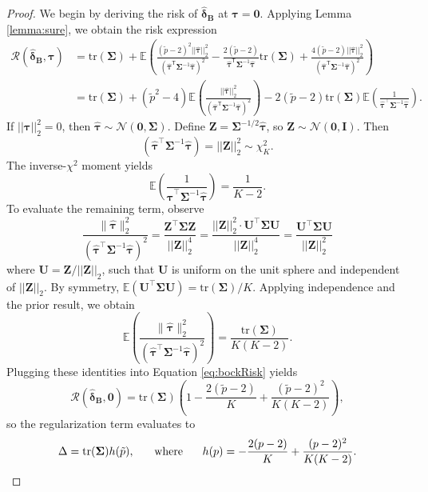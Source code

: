 \documentclass{article}
\newcommand{\bsZ}{\boldsymbol Z}
\newcommand{\bsU}{\boldsymbol U}
\newcommand{\bstau}{\boldsymbol \tau}
\newcommand{\hbstau}{\boldsymbol{\hat \tau}}
\newcommand{\bsSig}{\boldsymbol  \Sigma}
\def\E{\mathbb{E}}
\def\e{\mathbb{E}}
\newcommand{\Tr}{\text{tr}}
\newcommand{\bsdeltb}{\boldsymbol {\hat \delta_B}}
\newcommand{\tran}{\mathsf{T}}
\begin{document}
\begin{proof}
We begin by deriving the risk of $\bsdeltb$ at $\bstau = \boldsymbol 0$. Applying Lemma \ref{lemma:sure}, we obtain the risk expression 
\begin{equation}\label{eq:bockRisk}
\begin{aligned}
\mathcal{R}\left( \bsdeltb, \bstau \right) &= \Tr(\boldsymbol \Sigma) + \E \left( \frac{(\tilde p - 2)^2 ||\hbstau||_2^2}{(\hbstau^\tran \bsSig^{-1} \hbstau)^2}  - 
 \frac{2(\tilde p - 2)}{\hbstau^\tran \bsSig^{-1} \hbstau} \Tr(\bsSig) + \frac{4(\tilde p - 2)|| \hbstau ||_2^2}{(\hbstau^\tran \bsSig^{-1} \hbstau)^2} \right)  \\
&= \Tr(\boldsymbol \Sigma) + (\tilde p^2 - 4) \E \left( \frac{||\hbstau||_2^2}{(\hbstau^\tran \bsSig^{-1} \hbstau)^2} \right) - 2(\tilde p - 2)\Tr(\boldsymbol \Sigma) \E \left( \frac{1 }{\hbstau^\top \bsSig^{-1} \hbstau}  \right)  .
\end{aligned}
\end{equation}
If $||\bstau||_2^2 = 0$, then $\hbstau \sim \mathcal{N}(\boldsymbol 0, \bsSig)$. Define $\bsZ=\bsSig^{-1/2}\hbstau$, so $\bsZ\sim \mathcal N(\boldsymbol 0, \boldsymbol I)$. Then
\[ (\hbstau^\top \bsSig^{-1} \hbstau) = || \bsZ ||_2^2 \sim \chi^2_K. \] 
The inverse-$\chi^2$ moment yields 
\[ \e \left(\frac{1}{\hbstau^\top \bsSig^{-1}\hbstau}\right) =\frac{1}{K-2}.\]
To evaluate the remaining term, observe
\[ \frac{\|\hbstau\|_2^2}{(\hbstau^\top\bsSig^{-1}\hbstau)^2} = \frac{\bsZ^\top \bsSig \bsZ}{||\bsZ||_2^4} = \frac{||\bsZ||_2^2 \cdot \bsU^\top \bsSig \bsU}{||\bsZ||_2^4} = \frac{\bsU^\top \bsSig \bsU}{||\bsZ||_2^2} \]
where $\bsU=\bsZ/||\bsZ||_2$, such that $\bsU$ is uniform on the unit sphere and independent of $||\bsZ||_2$.
By symmetry, $\e(\bsU^\top\bsSig \bsU)=\Tr(\bsSig)/K$. Applying independence and the prior result, we obtain
\[ \e \left(\frac{\|\hbstau\|_2^2}{(\hbstau^\top\bsSig^{-1}\hbstau)^2}\right) = 
\frac{\mathrm{tr}(\bsSig)}{K(K-2)}.\]
Plugging these identities into Equation \ref{eq:bockRisk} yields 
\begin{equation}\label{eq:bockApproxRisk}
\mathcal{R}\left(\bsdeltb,\boldsymbol 0\right) = \Tr(\bsSig)\left( 1 -\frac{2(\tilde p-2)}{K} +\frac{(\tilde p-2)^2}{K(K-2)} \right),
\end{equation}
so the regularization term evaluates to 
\[ \Delta=\Tr(\bsSig)h(\tilde p), \hspace{5mm} \text{ where } \hspace{5mm} h(p)=-\frac{2(p-2)}{K}+\frac{(p-2)^2}{K(K-2)}. \]


\end{proof}
\end{document}
